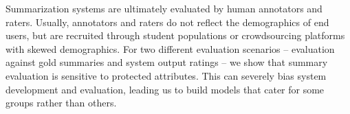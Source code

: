 Summarization systems are ultimately evaluated by human annotators and raters. Usually, annotators and raters do not reflect the demographics of end users, but are recruited through student populations or crowdsourcing platforms with skewed demographics. For two different evaluation scenarios -- evaluation against gold summaries and system output ratings -- we show that summary evaluation is sensitive to protected attributes. This can severely bias system development and evaluation, leading us to build models that cater for some groups rather than others.
